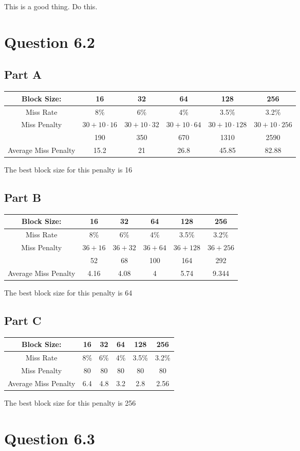 \documentclass[11pt]{article} %
\begin{document}
This is a good thing. Do this.

\section{Question 6.2}

\subsection{Part A}

\begin{tabular}{|c|c|c|c|c|c|}\hline
Block Size: & 16 & 32 & 64 & 128 & 256\\\hline
Miss Rate & 8\% & 6\% & 4\% & 3.5\% & 3.2\%\\\hline
Miss Penalty & $30+10\cdot 16$ & $30+10\cdot 32$ & $30+10\cdot 64$ & $30+10\cdot 128$ & $30+10\cdot 256$ \\
& 190 & 350 & 670 & 1310 & 2590 \\\hline
Average Miss Penalty & 15.2 & 21 & 26.8 & 45.85 & 82.88\\\hline
\end{tabular}

The best block size for this penalty is 16

\subsection{Part B}

\begin{tabular}{|c|c|c|c|c|c|}\hline
Block Size: & 16 & 32 & 64 & 128 & 256\\\hline
Miss Rate & 8\% & 6\% & 4\% & 3.5\% & 3.2\%\\\hline
Miss Penalty & $36 + 16$ & $36+ 32$ & $36+ 64$ & $36+128$ & $36+ 256$ \\
& 52 & 68 & 100 & 164 & 292 \\\hline
Average Miss Penalty & 4.16 & 4.08 & 4 & 5.74 & 9.344 \\\hline
\end{tabular}

The best block size for this penalty is 64

\subsection{Part C}

\begin{tabular}{|c|c|c|c|c|c|}\hline
Block Size: & 16 & 32 & 64 & 128 & 256\\\hline
Miss Rate & 8\% & 6\% & 4\% & 3.5\% & 3.2\%\\\hline
Miss Penalty & 80 & 80 & 80 & 80 & 80 \\\hline
Average Miss Penalty & 6.4 & 4.8 & 3.2 & 2.8 & 2.56 \\\hline
\end{tabular}

The best block size for this penalty is 256

\section{Question 6.3}
\end{document}
